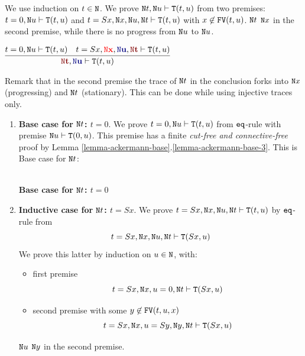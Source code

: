 \documentclass[a4paper,12pt]{article}
\newenvironment{proof}[1][Proof]{\begin{trivlist}
\item[\hskip \labelsep {\bfseries #1}]}{\end{trivlist}}
\newcommand{\Nat}               { {\tt N}  }
\newcommand{\FV}              { {\tt FV} }
\newcommand{\eq}              { {\tt eq} }
\newcommand{\Tot}           { {\tt T} }
\begin{document}
\begin{proof}
We use induction on $t \in \Nat$. We prove $\Nat t, \Nat u \vdash \Tot(t,u)$
from two premises:
$t=0, \Nat u \vdash \Tot(t,u)$ and $t=Sx, \Nat x, \Nat u, \Nat t \vdash \Tot(t,u)$
with $x \not \in \FV(t,u)$. 
$\Nat t$ {\color{red}{\bf progresses to}} $\Nat x$ in the second premise, while there is no
progress from $\Nat u$ to $\Nat u$.

\begin{center}
$
 \infer{{\redStat{\Nat t}}, {\blueStat{\Nat u}} \vdash \Tot(t,u)}
          {t=0, \Nat u \vdash \Tot(t,u)
          &
           t=Sx, {\redProg{\Nat x}}, {\blueStat{\Nat u}}, 
           {\redStat{\Nat t}} \vdash \Tot(t,u)
           }
$
\end{center}

Remark that in the second premise the trace of $\Nat t$
in the conclusion forks into $\Nat x$ (progressing) and $\Nat t$ (stationary). 
This can be done while using injective traces only.


\begin{enumerate}
\item
{\bf Base case for $\Nat t$: $t=0$}. 
We prove $t=0, \Nat u \vdash \Tot(t,u)$ from $\eq$-rule
with premise $\Nat u \vdash \Tot(0,u)$. This premise 
has a finite \emph{cut-free and connective-free} proof
by Lemma \ref{lemma-ackermann-base}.\ref{lemma-ackermann-base-3}.
This is Base case for $\Nat t$:

\begin{center}
\boxed{
$
\infer[\eq]{t=0, \Nat u \vdash \Tot(t,u)}
         {\deduce{\vdash \Tot(0,u)}
                       {Lemma \ \ref{lemma-ackermann-base}.\ref{lemma-ackermann-base-3}}
         }
$
}
\\
{\bf Base case for $\Nat t$: $t=0$}
\end{center}

\item
{\bf Inductive case for $\Nat t$: $t=Sx$}.
We prove $t=Sx, \Nat x, \Nat u, \Nat t \vdash \Tot(t,u)$ by $\eq$-rule
from $$t=Sx, \Nat x, \Nat u, \Nat t \vdash \Tot(Sx,u)$$
We prove this latter by induction on $u \in \Nat$, with:
\begin{itemize}
\item
first premise
$$t=Sx, \Nat x, u=0, \Nat t \vdash \Tot(Sx,u)$$ 
\item
second premise with some $y \not \in \FV(t,u,x)$
$$t=Sx, \Nat x, u=Sy, \Nat y, \Nat t \vdash \Tot(Sx,u)$$
\end{itemize}
$\Nat u$ {\bf \color{blue}{progresses to}} $\Nat y$ in the second premise.


\end{enumerate}
\end{proof}
\end{document}
